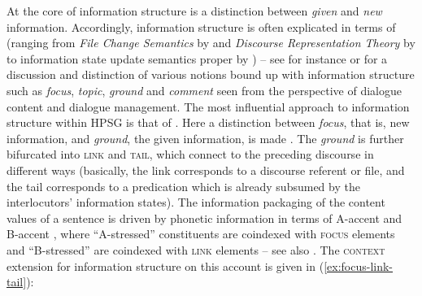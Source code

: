 \documentclass[output=paper,biblatex,babelshorthands,newtxmath,draftmode,colorlinks,citecolor=brown]{langscibook}
\begin{document}
At the core of information structure is a distinction between \emph{given} and \emph{new} information. 
%
Accordingly, information structure is often explicated in terms of  (ranging from \emph{File Change Semantics} by \citealt{Heim:2002} and \emph{Discourse Representation Theory} by \citealt{Kamp:Reyle:1993} to information state update semantics proper by \citealt{Traum:Larsson:2003}) -- see for instance \citet{Krifka:2008} or \citet{Vallduvi2015} for a discussion and distinction of various notions bound up with information structure such as \emph{focus}, \emph{topic}, \emph{ground} and \emph{comment} seen from the perspective of dialogue content and dialogue management.
%
The most influential approach to information structure within HPSG is that of \citet{Engdahl:Vallduvi:1996}.
%
Here a distinction between \emph{focus}, that is, new information, and \emph{ground}, the given information, is made \citep[]{Engdahl:Vallduvi:1996}. 
%
The \emph{ground} is further bifurcated into \textsc{link} and \textsc{tail}, which connect to the preceding discourse in different ways (basically, the link corresponds to a discourse referent or file, and the tail corresponds to a predication which is already subsumed by the interlocutors' information states).
%
The information packaging of the content values of a sentence is driven by phonetic information in terms of A-accent and B-accent \citep[Chapter~6]{Jackendoff:1972}, where \enquote{A-stressed} constituents are coindexed with \textsc{focus} elements and \enquote{B-stressed} are coindexed with \textsc{link} elements -- see also .
%
The \textsc{context} extension for information structure on this account is given in (\ref{ex:focus-link-tail}):
%
\ea \label{ex:focus-link-tail}
\z
\end{document}
